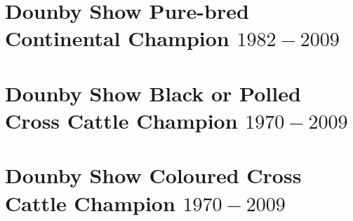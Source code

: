 \section[Pure-bred Continental Champion]{Dounby Show Pure-bred Continental Champion $1982 - 2009$}
\small

\normalsize
\newpage
\section[Black Cross Champion]{Dounby Show Black or Polled Cross Cattle Champion $1970 - 2009$}
\small

\normalsize
\newpage
\section[Coloured Cross Champion]{Dounby Show Coloured Cross Cattle Champion $1970 - 2009$}
\small

\normalsize
